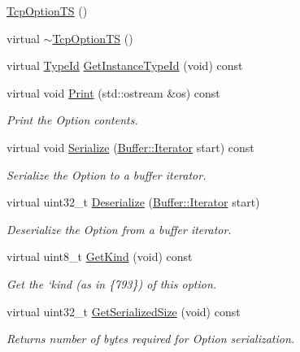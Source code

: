 \begin{DoxyCompactItemize}
\item 
\hyperlink{classns3_1_1TcpOptionTS_a2c8a30da7c246fba0b17dfb449cb9f58}{Tcp\+Option\+TS} ()
\item 
virtual \hyperlink{classns3_1_1TcpOptionTS_afe4e82f33e6ad3a7d1f077039bfdb792}{$\sim$\+Tcp\+Option\+TS} ()
\item 
virtual \hyperlink{classns3_1_1TypeId}{Type\+Id} \hyperlink{classns3_1_1TcpOptionTS_a95d2739629b72c44ad8da0a6df144345}{Get\+Instance\+Type\+Id} (void) const 
\item 
virtual void \hyperlink{classns3_1_1TcpOptionTS_a26807629b0479027d8b35366eb869a72}{Print} (std\+::ostream \&os) const 
\begin{DoxyCompactList}\small\item\em Print the Option contents. \end{DoxyCompactList}\item 
virtual void \hyperlink{classns3_1_1TcpOptionTS_a78c958095d201d40006442a5cea4e41d}{Serialize} (\hyperlink{classns3_1_1Buffer_1_1Iterator}{Buffer\+::\+Iterator} start) const 
\begin{DoxyCompactList}\small\item\em Serialize the Option to a buffer iterator. \end{DoxyCompactList}\item 
virtual uint32\+\_\+t \hyperlink{classns3_1_1TcpOptionTS_ae71464d31dff111b7bb6bf3bd0bd43b3}{Deserialize} (\hyperlink{classns3_1_1Buffer_1_1Iterator}{Buffer\+::\+Iterator} start)
\begin{DoxyCompactList}\small\item\em Deserialize the Option from a buffer iterator. \end{DoxyCompactList}\item 
virtual uint8\+\_\+t \hyperlink{classns3_1_1TcpOptionTS_aed740381b190fddac2eb37868b98c3be}{Get\+Kind} (void) const 
\begin{DoxyCompactList}\small\item\em Get the `kind\textquotesingle{} (as in \{793\}) of this option. \end{DoxyCompactList}\item 
virtual uint32\+\_\+t \hyperlink{classns3_1_1TcpOptionTS_a7a7ad69a22e63a72f6874fe8f3df994b}{Get\+Serialized\+Size} (void) const 
\begin{DoxyCompactList}\small\item\em Returns number of bytes required for Option serialization. \end{DoxyCompactList}\item 

\end{DoxyCompactItemize}
